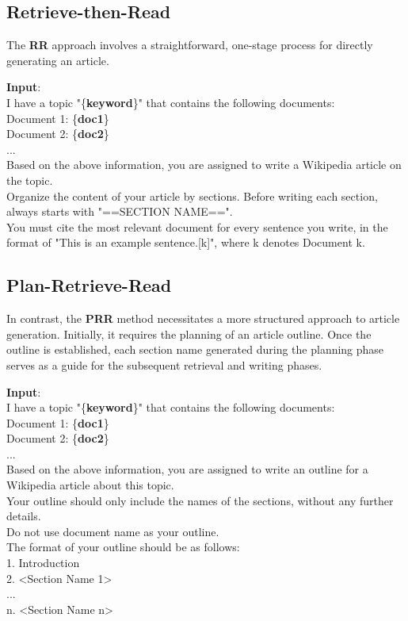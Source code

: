\subsection{Retrieve-then-Read} \label{RR prompt}
The \textbf{RR} approach involves a straightforward, one-stage process for directly generating an article. 
\begin{tcolorbox}[title = {Article Generation Prompt}]

\textbf{Input}:\\
I have a topic "\{\textbf{keyword}\}" that contains the following documents: \\
Document 1: \{\textbf{doc1}\} \\
Document 2: \{\textbf{doc2}\} \\
... \\
Based on the above information, you are assigned to write a Wikipedia article on the topic. \\
Organize the content of your article by sections. Before writing each section, always starts with "==SECTION NAME==". \\
You must cite the most relevant document for every sentence you write, in the format of "This is an example sentence.[k]", where k denotes Document k. \\

\end{tcolorbox}

\subsection{Plan-Retrieve-Read}
In contrast, the \textbf{PRR} method necessitates a more structured approach to article generation. Initially, it requires the planning of an article outline. Once the outline is established, each section name generated during the planning phase serves as a guide for the subsequent retrieval and writing phases.
\begin{tcolorbox}[title = {Outline Generation Prompt}]

\textbf{Input}:\\
I have a topic "\{\textbf{keyword}\}" that contains the following documents: \\
Document 1: \{\textbf{doc1}\} \\
Document 2: \{\textbf{doc2}\} \\
... \\
Based on the above information, you are assigned to write an outline for a Wikipedia article about this topic. \\
Your outline should only include the names of the sections, without any further details. \\
Do not use document name as your outline. \\
The format of your outline should be as follows: \\
1. Introduction \\
2. <Section Name 1> \\
... \\
n. <Section Name n> \\
\end{tcolorbox}

